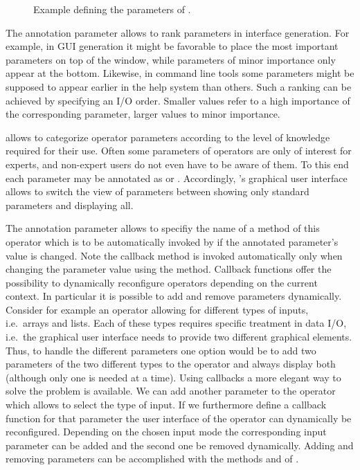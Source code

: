 \begin{figure}

\caption{\label{exa:defineParameters}Example defining the parameters of .}
\end{figure}

The annotation parameter  allows to rank parameters
in interface generation. For example, in GUI generation it might be favorable to place the most important 
parameters on top of the window, while parameters of minor importance only
appear at the bottom. Likewise, in command line tools some parameters might be
supposed to appear earlier in the help system than others.
Such a ranking can be achieved by specifying an I/O order. Smaller values refer
to a high importance of the corresponding parameter, larger values to minor importance.

\alida allows to categorize operator parameters according to the level
of knowledge required for their use. Often some parameters of operators are only of interest for experts, and non-expert users
do not even have to be aware of them. To this end each parameter may be
annotated as  or . Accordingly, \alida's graphical user
interface allows to switch the view of parameters between showing only standard parameters and
displaying all.

The annotation parameter  allows to specifiy the name of a method of this operator
which is to be automatically invoked by \alida if the annotated parameter's value is changed.
Note the callback method is invoked automatically only when changing the
parameter value using the  method. Callback functions offer the possibility to
dynamically reconfigure operators depending on the current context. In particular it is possible to
add and remove parameters dynamically. Consider for example an operator allowing for different types
of inputs, i.e.~arrays and lists. Each of these types requires specific treatment in data
I/O, i.e.~the graphical user interface needs to provide two different graphical elements. Thus,
to handle the different parameters one option would be to add two parameters of the two different
types to the operator and always display both (although only one is needed at a time). Using
callbacks a more elegant way to solve the problem is available. We can add another parameter
 to the operator which allows to select the type of input. If we furthermore
define a callback function for that parameter the user interface of the operator can dynamically be
reconfigured. Depending on the chosen input mode the corresponding input parameter can be added
and the second one be removed dynamically. Adding and removing parameters can be accomplished with
the methods  and  of .

